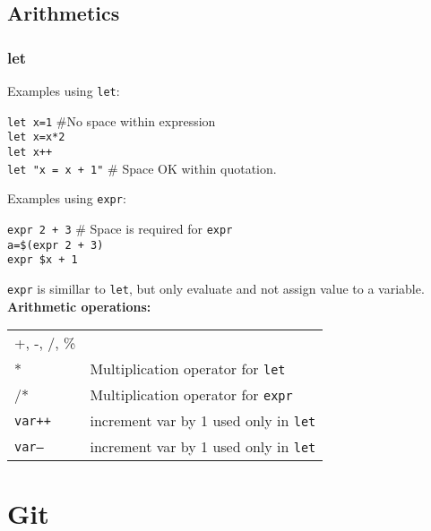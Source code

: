\subsection{Arithmetics}
\subsubsection{let}
Examples using \texttt{let}:\\

\begin{mdframed}
\texttt{let x=1} \#No space within expression\\
\texttt{let x=x*2}\\
\texttt{let x++}\\
\texttt{let "x = x + 1"} \# Space OK within quotation.
\end{mdframed}

Examples using \texttt{expr}:
\begin{mdframed}
\texttt{expr 2 + 3} \# Space is required for \texttt{expr}\\
\texttt{a=\$(expr 2 + 3)}\\
\texttt{expr \$x + 1}
\end{mdframed}

\texttt{expr} is simillar to \texttt{let}, but only evaluate and not assign value to a variable.\\

\textbf{Arithmetic operations:}

\begin{tabularx}{\linewidth}{lX}
+, -, /, \% & \\
* & Multiplication operator for \texttt{let}\\
/* & Multiplication operator for \texttt{expr}\\
\texttt{var++} & increment var by 1 used only in \texttt{let}\\
\texttt{var--} & increment var by 1 used only in \texttt{let}
\end{tabularx}


\vfill\null
\pagebreak

\section{Git}


